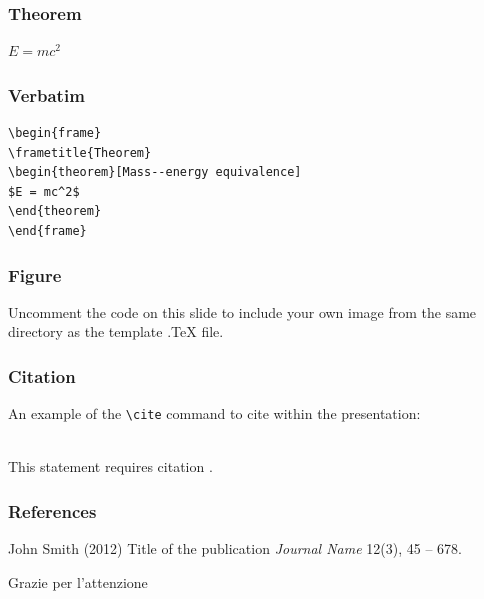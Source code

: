 \documentclass{beamer}
\begin{document}
\begin{frame}
\frametitle{Theorem}
\begin{theorem}
$E = mc^2$
\end{theorem}
\end{frame}


\begin{frame}[fragile] %
\frametitle{Verbatim}
\begin{example}
\begin{verbatim}
\begin{frame}
\frametitle{Theorem}
\begin{theorem}[Mass--energy equivalence]
$E = mc^2$
\end{theorem}
\end{frame}\end{verbatim}
\end{example}
\end{frame}


\begin{frame}
\frametitle{Figure}
Uncomment the code on this slide to include your own image from the same directory as the template .TeX file.
\end{frame}


\begin{frame}[fragile] %
\frametitle{Citation}
An example of the \verb|\cite| command to cite within the presentation:\\~

This statement requires citation \cite{p1}.
\end{frame}


\begin{frame}
\frametitle{References}
\footnotesize{
\begin{thebibliography}{99} %
 John Smith (2012)
\newblock Title of the publication
\newblock \emph{Journal Name} 12(3), 45 -- 678.
\end{thebibliography}
}
\end{frame}


\begin{frame}
\Huge{\centerline{Grazie per l'attenzione}}
\end{frame}

\end{document}
